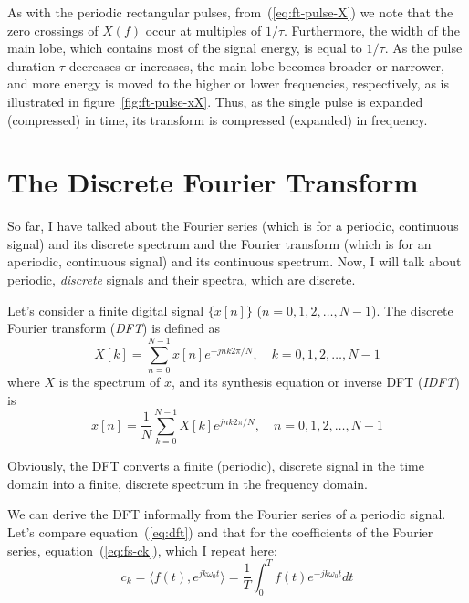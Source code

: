 As with the periodic rectangular pulses, from~(\ref{eq:ft-pulse-X}) we
note that the zero crossings of $X(f)$ occur at multiples of $1/\tau$.
Furthermore, the width of the main lobe, which contains most of the
signal energy, is equal to $1/\tau$. As the pulse duration $\tau$
decreases or increases, the main lobe becomes broader or narrower, and
more energy is moved to the higher or lower frequencies, respectively,
as is illustrated in figure~\ref{fig:ft-pulse-xX}. Thus, as the single
pulse is expanded (compressed) in time, its transform is compressed
(expanded) in frequency.

\section{The Discrete Fourier Transform}

So far, I have talked about the Fourier series (which is for a
periodic, continuous signal) and its discrete spectrum and the Fourier
transform (which is for an aperiodic, continuous signal) and its
continuous spectrum. Now, I will talk about periodic, \emph{discrete}
signals and their spectra, which are discrete.

Let's consider a finite digital signal $\{x[n]\}$ ($n=0,1,2,\ldots,
N-1$). The discrete Fourier transform (\emph{DFT}) is defined as
\begin{equation}
X[k] = \sum_{n=0}^{N-1} x[n] e^{-j n k 2\pi/N}, \quad k = 0,1,2,\ldots,
N-1
\label{eq:dft}
\end{equation}
where $X$ is the spectrum of $x$, and its synthesis equation or
inverse DFT (\emph{IDFT}) is
\begin{equation}
x[n]=\frac{1}{N} \sum_{k=0}^{N-1} X[k] e^{j n k 2\pi/N}, \quad
n=0,1,2,\ldots, N-1
\label{eq:idft}
\end{equation}

Obviously, the DFT converts a finite (periodic), discrete signal in
the time domain into a finite, discrete spectrum in the frequency
domain.

We can derive the DFT informally from the Fourier series of a periodic
signal. Let's compare equation~(\ref{eq:dft}) and that for the
coefficients of the Fourier series, equation~(\ref{eq:fs-ck}), which I
repeat here:
\begin{equation}
c_k=\langle f(t), e^{jk\omega_0 t}\rangle = \frac{1}{T}\int_0^T f(t)e^{-jk\omega_0
t}dt
\label{eq:fs-ckrepeat}
\end{equation}

